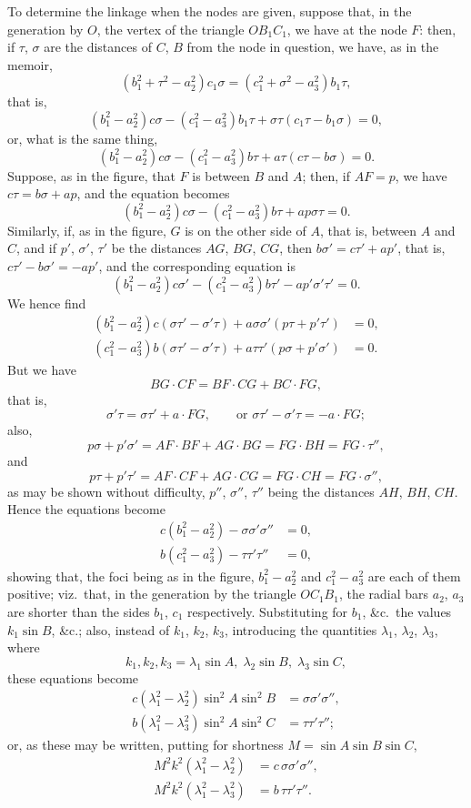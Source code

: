 \documentclass[11pt]{article}
\begin{document}
\bigskip

To determine the linkage when the nodes are given, suppose that, in the generation by $O$, the vertex of the triangle $OB_1C_1$, we have at the node $F$: then, if $\tau$, $\sigma$ are the distances of $C$, $B$ from the node in question, we have, as in the memoir,
\[
(b_1^2 + \tau^2 - a_2^2)c_1\sigma = (c_1^2 + \sigma^2 - a_3^2)b_1\tau,
\]
that is,
\[
(b_1^2 - a_2^2)c\sigma - (c_1^2 - a_3^2)b_1\tau + \sigma\tau(c_1\tau - b_1\sigma) = 0,
\]
or, what is the same thing,
\[
(b_1^2 - a_2^2)c\sigma - (c_1^2 - a_3^2)b\tau + a\tau(c\tau - b\sigma) = 0.
\]
Suppose, as in the figure, that $F$ is between $B$ and $A$; then, if $AF = p$, we have $c\tau = b\sigma + ap$, and the equation becomes
\[
(b_1^2 - a_2^2)c\sigma - (c_1^2 - a_3^2)b\tau + ap\sigma\tau = 0.
\]
Similarly, if, as in the figure, $G$ is on the other side of $A$, that is, between $A$ and $C$, and if $p'$, $\sigma'$, $\tau'$ be the distances $AG$, $BG$, $CG$, then $b\sigma' = c\tau' + ap'$, that is, $c\tau' - b\sigma' = -ap'$, and the corresponding equation is
\[
(b_1^2 - a_2^2)c\sigma' - (c_1^2 - a_3^2)b\tau' - ap'\sigma'\tau' = 0.
\]
We hence find
\begin{align*}
(b_1^2 - a_2^2)c(\sigma\tau' - \sigma'\tau) + a\sigma\sigma'(p\tau + p'\tau') &= 0,\\
(c_1^2 - a_3^2)b(\sigma\tau' - \sigma'\tau) + a\tau\tau'(p\sigma + p'\sigma') &= 0.
\end{align*}
But we have
\[
BG\cdot CF = BF\cdot CG + BC\cdot FG,
\]
that is,
\[
\sigma'\tau = \sigma\tau' + a\cdot FG,\qquad\text{or }\sigma\tau' - \sigma'\tau = -a\cdot FG;
\]
also,
\[
p\sigma + p'\sigma' = AF\cdot BF + AG\cdot BG = FG\cdot BH = FG\cdot \tau'',
\]
and
\[
p\tau + p'\tau' = AF\cdot CF + AG\cdot CG = FG\cdot CH = FG\cdot\sigma'',
\]
as may be shown without difficulty, $p''$, $\sigma''$, $\tau''$ being the distances $AH$, $BH$, $CH$. Hence the equations become
\begin{align*}
c(b_1^2 - a_2^2) - \sigma\sigma'\sigma'' &= 0,\\
b(c_1^2 - a_3^2) - \tau\tau'\tau'' &= 0,
\end{align*}
showing that, the foci being as in the figure, $b_1^2 - a_2^2$ and $c_1^2 - a_3^2$ are each of them positive; viz.\ that, in the generation by the triangle $OC_1B_1$, the radial bars $a_2$, $a_3$ are shorter than the sides $b_1$, $c_1$ respectively. Substituting for $b_1$, \&c.\ the values $k_1 \sin B$, \&c.; also, instead of $k_1$, $k_2$, $k_3$, introducing the quantities $\lambda_1$, $\lambda_2$, $\lambda_3$, where
\[
k_1, k_2, k_3 = \lambda_1\sin A,\;\lambda_2\sin B,\;\lambda_3\sin C,
\]
these equations become
\begin{align*}
c(\lambda_1^2 - \lambda_2^2)\sin^2 A\sin^2 B &= \sigma\sigma'\sigma'',\\
b(\lambda_1^2 - \lambda_3^2)\sin^2 A\sin^2 C &= \tau\tau'\tau'';
\end{align*}
or, as these may be written, putting for shortness $M = \sin A \sin B \sin C$,
\begin{align*}
M^2 k^2(\lambda_1^2 - \lambda_2^2) &= c\,\sigma\sigma'\sigma'',\\
M^2 k^2(\lambda_1^2 - \lambda_3^2) &= b\,\tau\tau'\tau''.
\end{align*}
\end{document}
